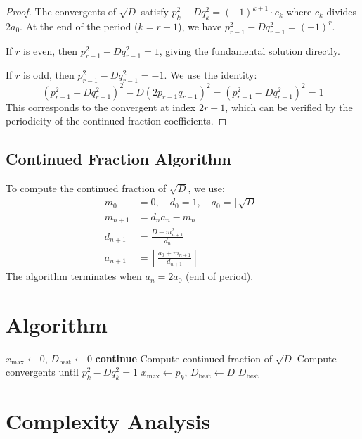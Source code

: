 \documentclass[12pt,a4paper]{article}
\begin{document}
\begin{proof}
The convergents of $\sqrt{D}$ satisfy $p_k^2 - D q_k^2 = (-1)^{k+1} \cdot c_k$ where $c_k$ divides $2a_0$. At the end of the period ($k = r-1$), we have $p_{r-1}^2 - D q_{r-1}^2 = (-1)^r$.

If $r$ is even, then $p_{r-1}^2 - D q_{r-1}^2 = 1$, giving the fundamental solution directly.

If $r$ is odd, then $p_{r-1}^2 - D q_{r-1}^2 = -1$. We use the identity:
\[
(p_{r-1}^2 + D q_{r-1}^2)^2 - D(2 p_{r-1} q_{r-1})^2 = (p_{r-1}^2 - D q_{r-1}^2)^2 = 1
\]
This corresponds to the convergent at index $2r-1$, which can be verified by the periodicity of the continued fraction coefficients.
\end{proof}

\subsection{Continued Fraction Algorithm}

To compute the continued fraction of $\sqrt{D}$, we use:
\begin{align}
m_0 &= 0, \quad d_0 = 1, \quad a_0 = \lfloor \sqrt{D} \rfloor \\
m_{n+1} &= d_n a_n - m_n \\
d_{n+1} &= \frac{D - m_{n+1}^2}{d_n} \\
a_{n+1} &= \left\lfloor \frac{a_0 + m_{n+1}}{d_{n+1}} \right\rfloor
\end{align}
The algorithm terminates when $a_n = 2a_0$ (end of period).

\section{Algorithm}

\begin{algorithm}[H]
\caption{Find $D \le 1000$ with largest minimal $x$}
\begin{algorithmic}[1]
\State $x_{\max} \gets 0$, $D_{\text{best}} \gets 0$
     \textbf{continue} \EndIf
    \State Compute continued fraction of $\sqrt{D}$
    \State Compute convergents until $p_k^2 - D q_k^2 = 1$
        \State $x_{\max} \gets p_k$, $D_{\text{best}} \gets D$
    \EndIf
\EndFor
\State \Return $D_{\text{best}}$
\end{algorithmic}
\end{algorithm}

\section{Complexity Analysis}
\end{document}
